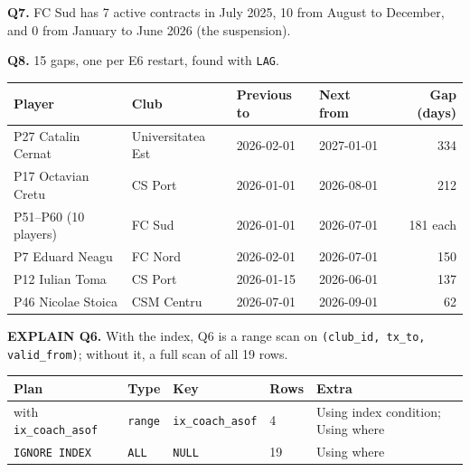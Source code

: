 \documentclass[10pt,a4paper]{article}
\newcommand{\code}[1]{\texttt{\small #1}}
\begin{document}
\textbf{Q7.}  FC Sud has 7 active contracts in July 2025, 10 from August to
December, and 0 from January to June 2026 (the suspension).

\textbf{Q8.}  15 gaps, one per E6 restart, found with \code{LAG}.
\begin{center}
\footnotesize
\begin{tabular}{@{}llllr@{}}
\toprule
Player & Club & Previous to & Next from & Gap (days)\\
\midrule
P27 Catalin Cernat & Universitatea Est & 2026-02-01 & 2027-01-01 & 334\\
P17 Octavian Cretu & CS Port & 2026-01-01 & 2026-08-01 & 212\\
P51--P60 (10 players) & FC Sud & 2026-01-01 & 2026-07-01 & 181 each\\
P7 Eduard Neagu & FC Nord & 2026-02-01 & 2026-07-01 & 150\\
P12 Iulian Toma & CS Port & 2026-01-15 & 2026-06-01 & 137\\
P46 Nicolae Stoica & CSM Centru & 2026-07-01 & 2026-09-01 & 62\\
\bottomrule
\end{tabular}
\end{center}

\textbf{EXPLAIN Q6.}  With the index, Q6 is a range scan on
\code{(club\_id, tx\_to, valid\_from)}; without it, a full scan of all 19 rows.
\begin{center}
\footnotesize
\begin{tabular}{@{}lllll@{}}
\toprule
Plan & Type & Key & Rows & Extra\\
\midrule
with \code{ix\_coach\_asof} & \code{range} & \code{ix\_coach\_asof} & 4 & Using index condition; Using where\\
\code{IGNORE INDEX} & \code{ALL} & \code{NULL} & 19 & Using where\\
\bottomrule
\end{tabular}
\end{center}
\end{document}
